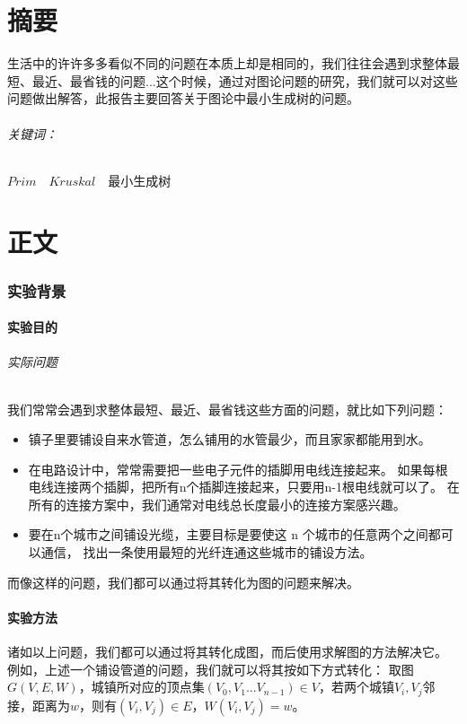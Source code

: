 \documentclass[a4paper,10pt]{ctexart}
\begin{document}
\part*{摘要}
生活中的许许多多看似不同的问题在本质上却是相同的，我们往往会遇到求整体最短、最近、最省钱的问题...这个时候，通过对图论问题的研究，我们就可以对这些问题做出解答，此报告主要回答关于图论中最小生成树的问题。
\\ \paragraph{关键词：}$Prim$\ \ $Kruskal$\ \ 最小生成树
\tableofcontents

\newpage
\part{正文}
\section{实验背景}

\subsection{实验目的}
\paragraph{实际问题} 我们常常会遇到求整体最短、最近、最省钱这些方面的问题，就比如下列问题：
\begin{itemize}
\item 镇子里要铺设自来水管道，怎么铺用的水管最少，而且家家都能用到水。
\item 在电路设计中，常常需要把一些电子元件的插脚用电线连接起来。 如果每根电线连接两个插脚，把所有n个插脚连接起来，只要用n-1根电线就可以了。 在所有的连接方案中，我们通常对电线总长度最小的连接方案感兴趣。
\item 要在n个城市之间铺设光缆，主要目标是要使这 n 个城市的任意两个之间都可以通信， 找出一条使用最短的光纤连通这些城市的铺设方法。
\end{itemize}
而像这样的问题，我们都可以通过将其转化为图的问题来解决。

\subsection{实验方法}
诸如以上问题，我们都可以通过将其转化成图，而后使用求解图的方法解决它。
例如，上述一个铺设管道的问题，我们就可以将其按如下方式转化：
取图$G(V,E,W)$，城镇所对应的顶点集$(V_0,V_1...V_{n-1}) \in V $，若两个城镇$V_i,V_j$邻接，距离为$w$，则有$(V_i,V_j)\in E$，$W(V_i,V_j)=w$。
\end{document}

